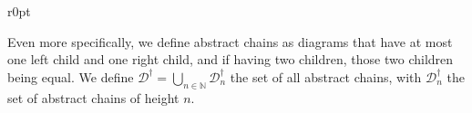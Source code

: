 \begin{wrapfigure}{r}{0pt}
\end{wrapfigure}

Even more specifically, we define abstract chains as diagrams that have at most one left child and one right child, and if having two children, those two children being equal. We define $\mathcal{D}^{\dagger} = \bigcup_{n \in \mathbb{N}} \mathcal{D}^{\dagger}_n$ the set of all abstract chains, with $\mathcal{D}^{\dagger}_n$ the set of abstract chains of height $n$.
